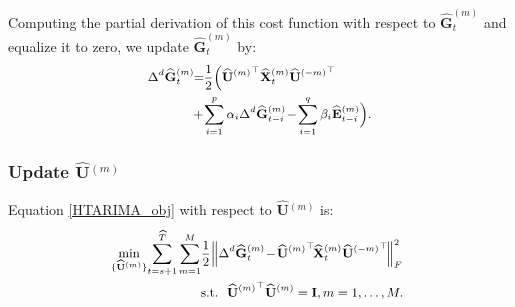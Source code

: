 \documentclass[letterpaper]{article} %
\numberwithin{theorem}{section}
\begin{document}
Computing  the partial derivation of this cost function  with respect to ${\widehat{\mathbf{G}}^{(m)}_{t}} $ and equalize it  to zero, we  update $\widehat{\mathbf{G}}^{(m)}_{t}  $ by:
\begin{equation}\label{HTARIMA_UpdateG}
\small
\begin{aligned}
\Delta^d  \widehat{\mathbf{G}}^{(m)}_{t}  \hspace{-0.1cm} & = \hspace{-0.1cm}  \frac{1}{2} \Big ( \widehat{\mathbf U}{^{(m)}}^\top {\widehat{\mathbf{X}}^{(m)}_{t}} \widehat{ \mathbf U}{^{(-m)}}^\top   \hspace{-0.05cm} \\ &  + \hspace{-0.05cm} \sum_{i=1}^{p} \alpha_i  \Delta^d  {\widehat{\mathbf{G}}^{(m)}_{{t-i}}}   \hspace{-0.05cm}- \hspace{-0.05cm}  \sum_{i=1}^{q} \beta_i {\widehat{\mathbf{E}}^{(m)}_{{t-i}}}            \Big).
\end{aligned}
\end{equation}

\subsubsection{Update $ \widehat{ \mathbf U}{^{(m)}} $  }
Equation \eqref{HTARIMA_obj} with respect to $ \widehat{ \mathbf U}{^{(m)}} $   is:
\begin{equation}\label{HTARIMA_updateU0}
\small
\begin{aligned}
\hspace{-0.1cm} \mathop{\min}_{ \{\widehat{ \mathbf U}{^{(m)}} \} }  \hspace{-0.05cm}  \sum_{t=s+1}^{\widehat{T}}  \hspace{-0.01cm} \sum_{m=1}^{M}  &    \frac{1}{2}  \Big \|   \Delta^d  {\widehat{\mathbf{G}}^{(m)}_{t}}  \hspace{-0.05cm}   -   \hspace{-0.05cm} \widehat{\mathbf U}{^{(m)}}^\top  \hspace{-0.05cm}  {\widehat{\mathbf{X}}^{(m)}_{t}}  \widehat{ \mathbf U}{^{(-m)}}^\top  \hspace{-0.05cm}  \Big  \| _F^2
\\ & \text{s.t.}  \ \ \widehat{ \mathbf U}{^{(m)}}^\top \widehat{ \mathbf U}{^{(m)}} = \mathbf I, m = 1,\ldots, M.
\end{aligned}
\end{equation}
\end{document}
